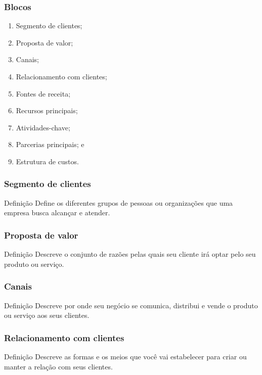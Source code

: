 \documentclass[aspectratio=169]{beamer}
\begin{document}
\begin{frame}
	\frametitle{Blocos}

	\begin{enumerate}
		\item Segmento de clientes;
		\item Proposta de valor;
		\item Canais;
		\item Relacionamento com clientes;
		\item Fontes de receita;
		\item Recursos principais;
		\item Atividades-chave;
		\item Parcerias principais; e
		\item Estrutura de custos.
	\end{enumerate}
\end{frame}

\begin{frame}
	\frametitle{Segmento de clientes}

	\begin{block}{Defini\c cão}
		 Define os diferentes grupos de pessoas ou organizações que uma empresa busca alcançar e atender.
	\end{block}
\end{frame}

\begin{frame}
	\frametitle{Proposta de valor}

	\begin{block}{Defini\c cão}
		 Descreve o conjunto de razões pelas quais seu cliente irá optar pelo seu produto ou serviço.
	\end{block}
\end{frame}

\begin{frame}
	\frametitle{Canais}

	\begin{block}{Defini\c cão}
		 Descreve por onde seu negócio se comunica, distribui e vende o produto ou serviço aos seus clientes.
	\end{block}
\end{frame}

\begin{frame}
	\frametitle{Relacionamento com clientes}

	\begin{block}{Defini\c cão}
		 Descreve as formas e os meios que você vai estabelecer para criar ou manter a relação com seus clientes.
	\end{block}
\end{frame}
\end{document}
